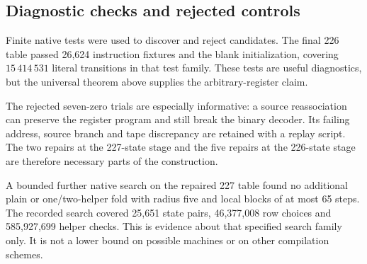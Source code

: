 \subsection{Diagnostic checks and rejected controls}

Finite native tests were used to discover and reject candidates. The final
226 table passed 26,624 instruction fixtures and the blank initialization,
covering $15\,414\,531$ literal transitions in that test family. These
tests are useful diagnostics, but the universal theorem above supplies
the arbitrary-register claim.

The rejected seven-zero trials are especially informative: a source
reassociation can preserve the register program and still break the
binary decoder. Its failing address, source branch and tape discrepancy
are retained with a replay script. The two repairs at the 227-state stage and the five repairs at the
226-state stage are therefore necessary parts of the construction.

A bounded further native search on the repaired 227 table found no
additional plain or one/two-helper fold with radius five and local blocks
of at most 65 steps. The recorded search covered 25,651 state pairs,
46,377,008 row choices and 585,927,699 helper checks. This is evidence about
that specified search family only. It is not a lower bound on possible
machines or on other compilation schemes.
